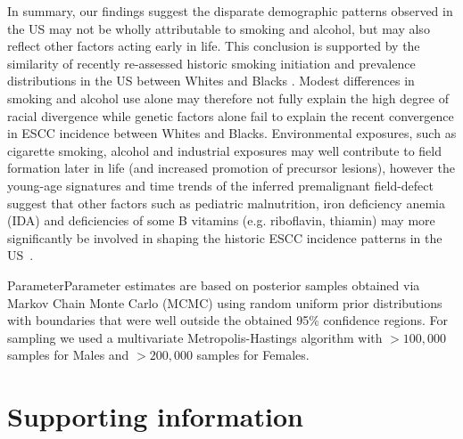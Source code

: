 \documentclass[10pt,letterpaper]{article}
\begin{document}
In summary, our findings suggest the disparate demographic patterns observed in the US may not be wholly attributable to smoking and alcohol, but may also reflect other factors acting early in life. This conclusion is supported by the similarity of recently re-assessed historic smoking initiation and prevalence distributions in the US between Whites and Blacks \cite{Holford2016}. Modest differences in smoking and alcohol use alone may therefore not fully explain the high degree of racial divergence while genetic factors alone fail to explain the recent convergence in ESCC incidence between Whites and Blacks. Environmental exposures, such as cigarette smoking, alcohol and industrial exposures may well contribute to field formation later in life (and increased promotion of precursor lesions), however the young-age signatures and time trends of the inferred premalignant field-defect suggest that other factors such as pediatric malnutrition, iron deficiency anemia (IDA) and deficiencies of some B vitamins (e.g. riboflavin, thiamin) may more significantly be involved in shaping the historic ESCC incidence patterns in the US~\cite{Taylor2013,Abnet2018}. 


\newpage
\noindent
ParameterParameter estimates are based on posterior samples obtained via Markov Chain Monte Carlo (MCMC) using random uniform prior distributions with boundaries that were well outside the obtained 95\% confidence regions. For sampling we used a multivariate Metropolis-Hastings algorithm with $>100,000$ samples for Males and $>200,000$ samples for Females. 


\newpage

\section*{Supporting information}

\end{document}
